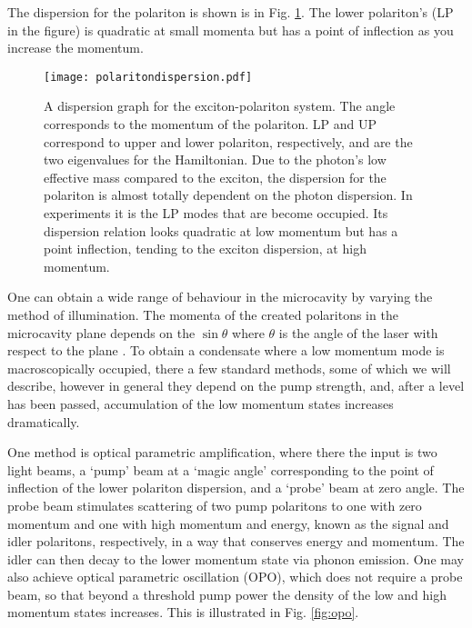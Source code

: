 \documentclass[letterpaper, 10 pt, conference]{IEEEtran}  %
\newcommand{\fig}[1]{Fig. #1}
\begin{document}
The dispersion for the polariton is shown is in \fig{\ref{fig:polaritondispersion}}. The lower polariton's (LP in the figure) is quadratic at small momenta but has a point of inflection as you increase the momentum\cite{doi:10.1080/00107514.2010.550120}. 

\begin{figure}[htbp!]
	\centering
	\texttt{[image: polaritondispersion.pdf]}
	\caption{A dispersion graph for the exciton-polariton system. The angle corresponds to the momentum of the polariton. LP and UP correspond to upper and lower polariton, respectively, and are the two eigenvalues for the Hamiltonian. Due to the photon's low effective mass compared to the exciton, the dispersion for the polariton is almost totally dependent on the photon dispersion. In experiments it is the LP modes that are become occupied. Its dispersion relation looks quadratic at low momentum but has a point inflection, tending to the exciton dispersion, at high momentum. \cite{doi:10.1080/00107514.2010.550120}}
	\label{fig:polaritondispersion}
\end{figure}

One can obtain a wide range of behaviour in the microcavity by varying the method of illumination. 
The momenta of the created polaritons in the microcavity plane depends on the $\sin \theta$ where $\theta$ is the angle of the laser with respect to the plane \cite{doi:10.1080/00107514.2010.550120}. 
To obtain a condensate where a low momentum mode is macroscopically occupied, there a few standard methods, some of which we will describe, however in general they depend on the pump strength, and, after a level has been passed, accumulation of the low momentum states increases dramatically.

One method is optical parametric amplification, where there the input is two light beams, a `pump' beam at a `magic angle' corresponding to the point of inflection of the lower polariton dispersion, and a `probe' beam at zero angle. 
The probe beam stimulates scattering of two pump polaritons to one with zero momentum and one with high momentum and energy, known as the signal and idler polaritons, respectively, in a way that conserves energy and momentum. 
The idler can then decay to the lower momentum state via phonon emission.
One may also achieve optical parametric oscillation (OPO), which does not require a probe beam, so that beyond a threshold pump power the density of the low and high momentum states increases.
This is illustrated in \fig{\ref{fig:opo}}.
\end{document}

